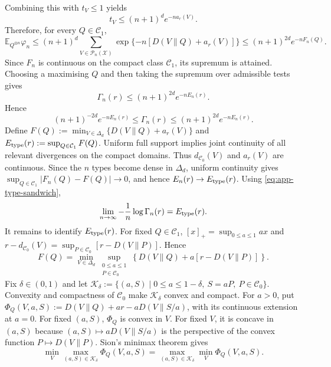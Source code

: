 \documentclass[journal,10pt,draftclsnofoot,onecolumn]{IEEEtran}
\begin{document}
\begin{IEEEproof}
Combining this with $t_V\leq1$ yields
\begin{equation}
t_V
\leq
(n+1)^d e^{-na_r(V)}.
\label{eq:app-type-test-upper}
\end{equation}
Therefore, for every $Q\in\mathcal C_1$,
\begin{equation*}
\mathbb E_{Q^{\otimes n}}\varphi_n
\leq
(n+1)^d
\sum_{V\in\mathcal P_n(\mathcal X)}
\exp\{-n[D(V\|Q)+a_r(V)]\}
\leq
(n+1)^{2d}e^{-nF_n(Q)}.
\end{equation*}
Since $F_n$ is continuous on the compact class $\mathcal C_1$, its
supremum is attained. Choosing a maximising $Q$ and then taking the
supremum over admissible tests gives
\begin{equation}
\Gamma_n(r)
\leq
(n+1)^{2d}e^{-nE_n(r)}.
\label{eq:app-gamma-upper}
\end{equation}
Hence
\begin{equation}
(n+1)^{-2d}e^{-nE_n(r)}
\leq
\Gamma_n(r)
\leq
(n+1)^{2d}e^{-nE_n(r)}.
\label{eq:app-type-sandwich}
\end{equation}
Define
$F(Q):=\min_{V\in\Delta_d}\{D(V\|Q)+a_r(V)\}$ and
$E_{\rm type}(r):=\sup_{Q\in\mathcal C_1}F(Q)$.
Uniform full support implies joint continuity of all relevant
divergences on the compact domains. Thus $d_{\mathcal C_0}(V)$ and
$a_r(V)$ are continuous. Since the $n$ types become dense in
$\Delta_d$, uniform continuity gives
$\sup_{Q\in\mathcal C_1}|F_n(Q)-F(Q)|\to0$, and hence
$E_n(r)\to E_{\rm type}(r)$. Using \eqref{eq:app-type-sandwich},
\begin{equation}
\lim_{n\to\infty}
-\frac{1}{n}\log\Gamma_n(r)
=
E_{\rm type}(r).
\label{eq:app-type-exponent}
\end{equation}
It remains to identify $E_{\rm type}(r)$. For fixed
$Q\in\mathcal C_1$, $[x]_+=\sup_{0\leq a\leq1}ax$ and
$r-d_{\mathcal C_0}(V)
=\sup_{P\in\mathcal C_0}[r-D(V\|P)]$. Hence
\begin{equation}
F(Q)
=
\min_{V\in\Delta_d}
\sup_{\substack{0\leq a\leq1\\P\in\mathcal C_0}}
\left\{
D(V\|Q)
+
a[r-D(V\|P)]
\right\}.
\label{eq:app-minmax-start}
\end{equation}
Fix $\delta\in(0,1)$ and let
$\mathcal K_\delta
:=\{(a,S)\mid 0\leq a\leq1-\delta,\ S=aP,\ P\in\mathcal C_0\}$.
Convexity and compactness of $\mathcal C_0$ make
$\mathcal K_\delta$ convex and compact. For $a>0$, put
$\Phi_Q(V,a,S):=D(V\|Q)+ar-aD(V\|S/a)$, with its continuous extension
at $a=0$. For fixed $(a,S)$, $\Phi_Q$ is convex in $V$. For fixed $V$, it is
concave in $(a,S)$ because
$(a,S)\mapsto aD(V\|S/a)$ is the perspective of the convex function
$P\mapsto D(V\|P)$. Sion's minimax theorem gives
\begin{equation}
\min_V
\max_{(a,S)\in\mathcal K_\delta}
\Phi_Q(V,a,S)
=
\max_{(a,S)\in\mathcal K_\delta}
\min_V
\Phi_Q(V,a,S).
\label{eq:app-sion}
\end{equation}


\end{IEEEproof}
\end{document}
